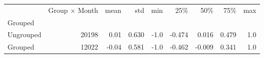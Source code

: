 \begin{tabular}{lrrrrrrrr}
\toprule
{} &  Group $\times$ Month &  mean &    std &  min &    25\% &    50\% &    75\% &  max \\
Grouped   &                       &       &        &      &        &        &        &      \\
\midrule
Ungrouped &                 20198 &  0.01 &  0.630 & -1.0 & -0.474 &  0.016 &  0.479 &  1.0 \\
Grouped   &                 12022 & -0.04 &  0.581 & -1.0 & -0.462 & -0.009 &  0.341 &  1.0 \\
\bottomrule
\end{tabular}
